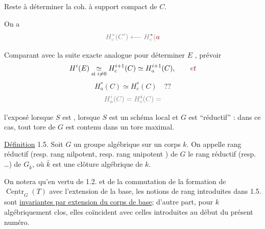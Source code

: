 Reste à déterminer la coh. à support compact de $C$.

On a
\[
\deleted{H_c^*(C')\longleftarrow H_c^{\unsure{*}}(\unsure{a}}
\]

Comparant avec la suite exacte analogue pour déterminer  $E$ ,  prévoir
\[
H^i(E)\underset{\text{si }i\neq0}{\simeq}H_c^{i+1}(C)
\simeq H_{\unsure{a}}^{i+1}(C),
\qquad \deleted{\unsure{et}}
\]
\[
\boxed{H_a^*(C)\simeq H_c^*(C)\quad ??}
\]
\[
\deleted{H_a^i(C)=H_c^{\unsure{i}}(C)=}
\]


l'exposé   lorsque $S$ est ,    lorsque $S$ est un schéma local et $G$ est ``réductif'' : dans ce cas, tout tore de $G$ est contenu dans un tore maximal.

\uline{Définition} 1.5. Soit $G$ un groupe algébrique sur un corps $k$. 
On appelle rang réductif (resp. rang nilpotent, resp. rang unipotent \unsure{\ldots}) de $G$ le rang réductif (resp. \ldots) de $G_{\bar k}$, où $\bar k$ est une clôture algébrique de $k$.

On notera qu'en vertu de 1.2. et de la commutation de la formation de $\underline{\operatorname{Centr}}_G(T)$ avec l'extension de la base,  les  notions de rang introduites dans 1.5. sont \uline{invariantes par extension du corps de base}; d'autre part, pour $k$ algébriquement clos, elles coïncident avec celles introduites au début du présent numéro.

